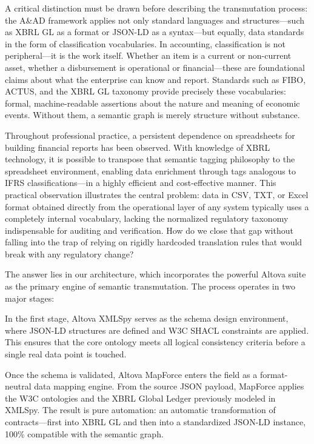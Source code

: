 \documentclass[12pt, a4paper]{article}
\begin{document}
A critical distinction must be drawn before describing the transmutation process: the A\&AD framework applies not only standard languages and structures---such as XBRL GL as a format or JSON-LD as a syntax---but equally, data standards in the form of classification vocabularies. In accounting, classification is not peripheral---it is the work itself. Whether an item is a current or non-current asset, whether a disbursement is operational or financial---these are foundational claims about what the enterprise can know and report. Standards such as FIBO, ACTUS, and the XBRL GL taxonomy provide precisely these vocabularies: formal, machine-readable assertions about the nature and meaning of economic events. Without them, a semantic graph is merely structure without substance.

Throughout professional practice, a persistent dependence on spreadsheets for building financial reports has been observed. With knowledge of XBRL technology, it is possible to transpose that semantic tagging philosophy to the spreadsheet environment, enabling data enrichment through tags analogous to IFRS classifications---in a highly efficient and cost-effective manner. This practical observation illustrates the central problem: data in CSV, TXT, or Excel format obtained directly from the operational layer of any system typically uses a completely internal vocabulary, lacking the normalized regulatory taxonomy indispensable for auditing and verification. How do we close that gap without falling into the trap of relying on rigidly hardcoded translation rules that would break with any regulatory change?

The answer lies in our architecture, which incorporates the powerful Altova suite as the primary engine of semantic transmutation. The process operates in two major stages:

In the first stage, Altova XMLSpy serves as the schema design environment, where JSON-LD structures are defined and W3C SHACL constraints are applied. This ensures that the core ontology meets all logical consistency criteria before a single real data point is touched.

Once the schema is validated, Altova MapForce enters the field as a format-neutral data mapping engine. From the source JSON payload, MapForce applies the W3C ontologies and the XBRL Global Ledger previously modeled in XMLSpy. The result is pure automation: an automatic transformation of contracts---first into XBRL GL and then into a standardized JSON-LD instance, 100\% compatible with the semantic graph.
\end{document}
